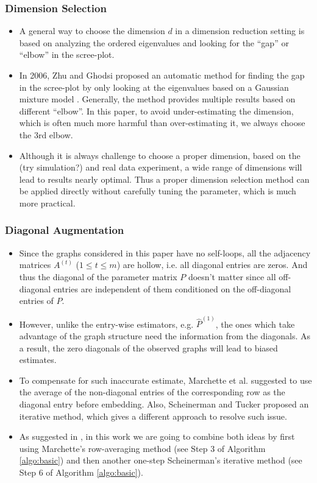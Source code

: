 \documentclass[a4paper]{article}
\renewcommand{\hat}{\widehat}
\begin{document}
\subsubsection{Dimension Selection}
\label{section:dim_select}
\begin{itemize}
\item A general way to choose the dimension $d$ in a dimension reduction setting is based on analyzing the ordered eigenvalues and looking for the ``gap'' or ``elbow'' in the scree-plot.
\item In 2006, Zhu and Ghodsi proposed an automatic method for finding the gap in the scree-plot by only looking at the eigenvalues based on a Gaussian mixture model \cite{zhu2006automatic}. Generally, the method provides multiple results based on different ``elbow''. In this paper, to avoid under-estimating the dimension, which is often much more harmful than over-estimating it, we always choose the 3rd elbow.
\item Although it is always challenge to choose a proper dimension, based on the (try simulation?) and real data experiment, a wide range of dimensions will lead to results nearly optimal. Thus a proper dimension selection method can be applied directly without carefully tuning the parameter, which is much more practical.
\end{itemize}

\subsubsection{Diagonal Augmentation}
\label{section:diag_aug}
\begin{itemize}
\item Since the graphs considered in this paper have no self-loops, all the adjacency matrices $A^{(t)}$ ($1 \le t \le m$) are hollow, i.e. all diagonal entries are zeros. And thus the diagonal of the parameter matrix $P$ doesn't matter since all off-diagonal entries are independent of them conditioned on the off-diagonal entries of $P$.
\item However, unlike the entry-wise estimators, e.g. $\hat{P}^{(1)}$, the ones which take advantage of the graph structure need the information from the diagonals. As a result, the zero diagonals of the observed graphs will lead to biased estimates. 
\item To compensate for such inaccurate estimate, Marchette et al. \cite{marchette2011vertex} suggested to use the average of the non-diagonal entries of the corresponding row as the diagonal entry before embedding. Also, Scheinerman and Tucker \cite{scheinerman2010modeling} proposed an iterative method, which gives a different approach to resolve such issue.
\item As suggested in \cite{tang2016law}, in this work we are going to combine both ideas by first using Marchette's row-averaging method (see Step 3 of Algorithm \ref{algo:basic}) and then another one-step Scheinerman's iterative method (see Step 6 of Algorithm \ref{algo:basic}).
\end{itemize}
\end{document}
